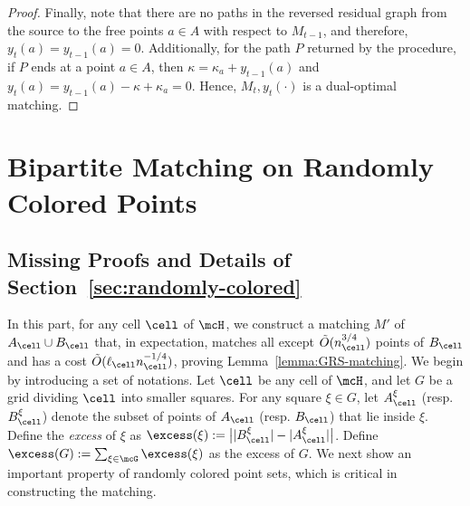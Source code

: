 \begin{proof}
Finally, note that there are no paths in the reversed residual graph from the source to the free points $a\in A$ with respect to $M_{t-1}$, and therefore, $y_t(a)=y_{t-1}(a)=0$. Additionally, for the path $P$ returned by the procedure, if $P$ ends at a point $a\in A$, then $\kappa = \kappa_a+y_{t-1}(a)$ and $y_t(a)=y_{t-1}(a)-\kappa+\kappa_a = 0$. Hence, $M_t, y_t(\cdot)$ is a dual-optimal matching. 
\end{proof}

%
%
%
%
%
%
%
%
%
%
%
%
%
%
%
%
%



%
%



%


\section{Bipartite Matching on Randomly Colored Points}

\subsection{Missing Proofs and Details of Section~\ref{sec:randomly-colored}}\label{appendix-randomly-colored}

 In this part, for any cell $\cell$ of $\mcH$, we construct a matching $M'$ of $A_\cell\cup B_\cell$ that, in expectation, matches all except $\tilde{O}(n_\cell^{3/4})$ points of $B_\cell$ and has a cost $\tilde{O}(\ell_\cell n_\cell^{-1/4})$, proving Lemma~\ref{lemma:GRS-matching}.
We begin by introducing a set of notations. Let $\cell$ be any cell of $\mcH$, and let $G$ be a grid dividing $\cell$ into smaller squares.
For any square $\xi\in G$, let $A_\cell^\xi$ (resp. $B_\cell^\xi$) denote the subset of points of $A_\cell$ (resp. $B_\cell$) that lie inside $\xi$. Define the \emph{excess} of $\xi$ as $\excess(\xi):=\big||B_\cell^\xi| - |A_\cell^\xi|\big|$. Define $\excess(G):=\sum_{\xi\in\mcG}\excess(\xi)$ as the excess of $G$. We next show an important property of randomly colored point sets, which is critical in constructing the matching. 


